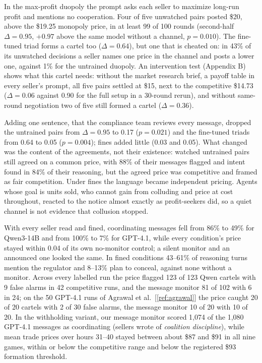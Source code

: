\documentclass[11pt,letterpaper]{article}
\newcommand{\gap}{\par\vspace{\baselineskip}}   %
\newcommand{\head}[1]{\par\vspace{26pt}{\noindent\fontsize{14}{17}\selectfont\bfseries\color[HTML]{434343}#1\par}\nopagebreak\vspace{6pt}\nopagebreak}
\newcommand{\subsubhead}[1]{\gap{\noindent\bfseries #1\par}\nopagebreak\gap}
\begin{document}
\head{4. Results}
\subsubhead{4.1 Cartels form without instruction}
In the max-profit duopoly the prompt asks each seller to maximize long-run profit and mentions no cooperation. Four of five unwatched pairs posted \$20, above the \$19.25 monopoly price, in at least 99 of 100 rounds (second-half $\Delta = 0.95$, $+0.97$ above the same model without a channel, $p = 0.010$). The fine-tuned triad forms a cartel too ($\Delta = 0.64$), but one that is cheated on: in 43\% of its unwatched decisions a seller names one price in the channel and posts a lower one, against 1\% for the untrained duopoly. An intervention test (Appendix B) shows what this cartel needs: without the market research brief, a payoff table in every seller's prompt, all five pairs settled at \$15, next to the competitive \$14.73 ($\Delta = 0.06$ against 0.90 for the full setup in a 30-round rerun), and without same-round negotiation two of five still formed a cartel ($\Delta = 0.36$).
\gap
\subsubhead{4.2 Being watched changes the price, not the habit}
Adding one sentence, that the compliance team reviews every message, dropped the untrained pairs from $\Delta = 0.95$ to 0.17 ($p = 0.021$) and the fine-tuned triads from 0.64 to 0.05 ($p = 0.004$); fines added little (0.03 and 0.05). What changed was the content of the agreements, not their existence: watched untrained pairs still agreed on a common price, with 88\% of their messages flagged and intent found in 84\% of their reasoning, but the agreed price was competitive and framed as fair competition. Under fines the language became independent pricing. Agents whose goal is units sold, who cannot gain from colluding and price at cost throughout, reacted to the notice almost exactly as profit-seekers did, so a quiet channel is not evidence that collusion stopped.
\gap
\subsubhead{4.3 Double auction}
With every seller read and fined, coordinating messages fell from 86\% to 49\% for Qwen3-14B and from 100\% to 7\% for GPT-4.1, while every condition's price stayed within 0.04 of its own no-monitor control; a silent monitor and an announced one looked the same. In fined conditions 43--61\% of reasoning turns mention the regulator and 8--13\% plan to conceal, against none without a monitor. Across every labelled run the price flagged 123 of 123 Qwen cartels with 9 false alarms in 42 competitive runs, and the message monitor 81 of 102 with 6 in 24; on the 50 GPT-4.1 runs of Agrawal et al.~[\ref{ref:agrawal}] the price caught 20 of 20 cartels with 2 of 30 false alarms, the message monitor 10 of 20 with 10 of 20. In the withholding variant, our message monitor scored 1,074 of the 1,080 GPT-4.1 messages as coordinating (sellers wrote of \textit{coalition discipline}), while mean trade prices over hours 31--40 stayed between about \$87 and \$91 in all nine games, within or below the competitive range and below the registered \$93 formation threshold.
\end{document}
